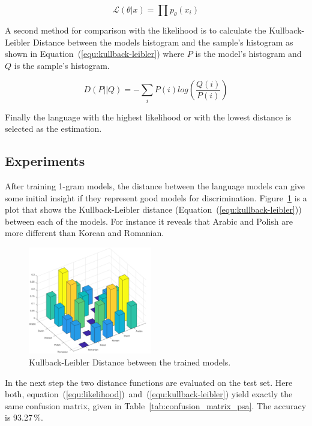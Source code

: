 \documentclass{article}
\begin{document}
\begin{equation}
\label{equ:likelihood}
    \mathcal{L}(\theta | x) = \prod p_{\theta} (x_i)
\end{equation}

A second method for comparison with the likelihood is to calculate the Kullback-Leibler Distance between the models histogram and the sample's histogram as shown in Equation~(\ref{equ:kullback-leibler}) where $P$ is the model's histogram and $Q$ is the sample's histogram.

\begin{equation}
\label{equ:kullback-leibler}
    D(P || Q) = - \sum_{i} P(i) log\left(\frac{Q(i)}{P(i)}\right)
\end{equation}

Finally the language with the highest likelihood or with the lowest distance is selected as the estimation.

\subsection{Experiments}

After training 1-gram models, the distance between the language models can give some initial insight if they represent good models for discrimination. Figure~\ref{fig:distance_between_languages} is a plot that shows the Kullback-Leibler distance (Equation~(\ref{equ:kullback-leibler})) between each of the models. For instance it reveals that Arabic and Polish are more different than Korean and Romanian.

\begin{figure}[h]
    \centering
    \includegraphics[width=0.48\textwidth]{img/kullback-leibler_5languages.pdf}
    \caption{Kullback-Leibler Distance between the trained models.}
    \label{fig:distance_between_languages}
\end{figure}

In the next step the two distance functions are evaluated on the test set. Here both, equation~(\ref{equ:likelihood})~and~(\ref{equ:kullback-leibler}) yield exactly the same confusion matrix, given in Table~\ref{tab:confusion_matrix_psa}. The accuracy is 93.27\,\%.
\end{document}
